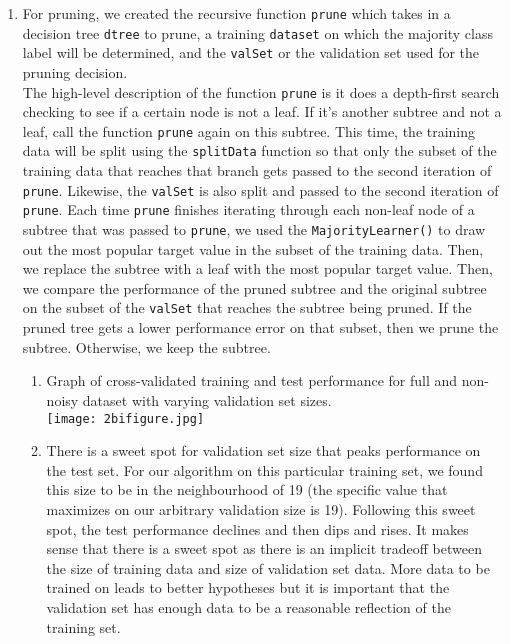 \documentclass[12pt,letterpaper]{article}
\newcounter{partnumber}
\newcommand{\Part}{\stepcounter{partnumber}\item[(\alph{partnumber})]}
\begin{document}
\begin{enumerate}
\begin{enumerate}
        \Part For pruning, we created the recursive function \verb|prune| which takes in a decision tree \verb|dtree| to prune, a training \verb|dataset| on which the majority class label will be determined, and the \verb|valSet| or the validation set used for the pruning decision. \medskip \\ 
        The high-level description of the function \verb|prune| is it does a depth-first search checking to see if a certain node is not a leaf. If it's another subtree and not a leaf, call the function \verb|prune| again on this subtree. This time, the training data will be split using the \verb|splitData| function so that only the subset of the training data that reaches that branch gets passed to the second iteration of \verb|prune|. Likewise, the \verb|valSet| is also split and passed to the second iteration of \verb|prune|. 
        Each time \verb|prune| finishes iterating through each non-leaf node of a subtree that was passed to \verb|prune|, we used the \verb|MajorityLearner()| to draw out the most popular target value in the subset of the training data. Then, we replace the subtree with a leaf with the most popular target value. Then, we compare the performance of the pruned subtree and the original subtree on the subset of the \verb|valSet| that reaches the subtree being pruned. If the pruned tree gets a lower performance error on that subset, then we prune the subtree. Otherwise, we keep the subtree. \medskip \\ 
        \begin{enumerate}[ref=(\roman{*})]
        \item  Graph of cross-validated training and test performance for full and non-noisy dataset with varying validation set sizes. \\
        \texttt{[image: 2bifigure.jpg]}\\
        \item 
 There is a sweet spot for validation set size that peaks performance on the test set. For our algorithm on this particular training set, we found this size to be in the neighbourhood of 19 (the specific value that maximizes on our arbitrary validation size is 19). Following this sweet spot, the test performance declines and then dips and rises. It makes sense that there is a sweet spot as there is an implicit tradeoff between the size of training data and size of validation set data. More data to be trained on leads to better hypotheses but it is important that the validation set has enough data to be a reasonable reflection of the training set.\\


\end{enumerate}
\end{enumerate}
\end{enumerate}
\end{document}
